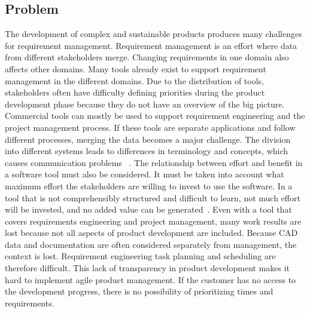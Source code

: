     \subsection*{Problem}
    The development of complex and sustainable products produces many challenges for requirement management. Requirement management is an effort where data from different stakeholders merge. 
    Changing requirements in one domain also affects other domains. Many tools already exist to support requirement management in the different domains. Due to the distribution of tools, stakeholders often have difficulty defining priorities during the product development phase because they do not have an overview of the big picture. Commercial tools can mostly be used to support requirement engineering and the project management process. If these tools are separate applications and follow different processes, merging the data becomes a major challenge. The division into different systems leads to differences in terminology and concepts, which causes communication problems~\cite{Jorma2014} .
    The relationship between effort and benefit in a software tool must also be considered. It must be taken into account what maximum effort the stakeholders are willing to invest to use the software. In a tool that is not comprehensibly structured and difficult to learn, not much effort will be invested, and no added value can be generated~\cite{RICHTER2020271}.
    Even with a tool that covers requirements engineering and project management, many work results are lost because not all aspects of product development are included. Because CAD data and documentation are often considered separately from management, the context is lost. 
    Requirement engineering task planning and scheduling are therefore difficult.
    This lack of transparency in product development makes it hard to implement agile product management. If the customer has no access to the development progress, there is no possibility of prioritizing times and requirements. 

